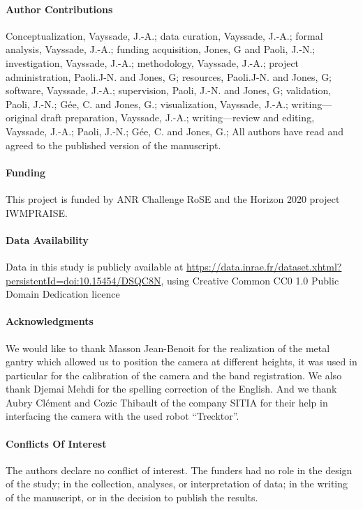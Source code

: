 \documentclass[../thesis.tex]{subfiles}
\begin{document}
	\newpage
	\paragraph*{Author Contributions}{
		Conceptualization, Vayssade, J.-A.;
		data curation, Vayssade, J.-A.;
		formal analysis, Vayssade, J.-A.;
		funding acquisition, Jones, G and Paoli, J.-N.;
		investigation, Vayssade, J.-A.;
		methodology, Vayssade, J.-A.; 
		project administration, Paoli.J-N. and Jones, G;
		resources, Paoli.J-N. and Jones, G;
		software, Vayssade, J.-A.;
		supervision, Paoli, J.-N. and Jones, G;
		validation, Paoli, J.-N.; Gée, C. and Jones, G.;
		visualization, Vayssade, J.-A.;
		writing---original draft preparation, Vayssade, J.-A.;
		writing---review and editing, Vayssade, J.-A.; Paoli, J.-N.; Gée, C. and Jones, G.;
		All authors have read and agreed to the published version of the manuscript.
	}

	\paragraph*{Funding}{This project is funded by ANR Challenge RoSE and the Horizon 2020 project IWMPRAISE.}

	\paragraph*{Data Availability}{Data in this study is publicly available at \url{https://data.inrae.fr/dataset.xhtml?persistentId=doi:10.15454/DSQC8N}, using Creative Common CC0 1.0 Public Domain Dedication licence}

	\paragraph*{Acknowledgments}{We would like to thank Masson Jean-Benoit for the realization of the metal gantry which allowed us to position the camera at different heights, it was used in particular for the calibration of the camera and the band registration. We also thank Djemai Mehdi for the spelling correction of the English. And we thank Aubry Clément and Cozic Thibault of the company SITIA for their help in interfacing the camera with the used robot ``Trecktor''.}

	\paragraph*{Conflicts Of Interest}{The authors declare no conflict of interest. The funders had no role in the design of the study; in the collection, analyses, or interpretation of data; in the writing of the manuscript, or in the decision to publish the results.}
\end{document}
